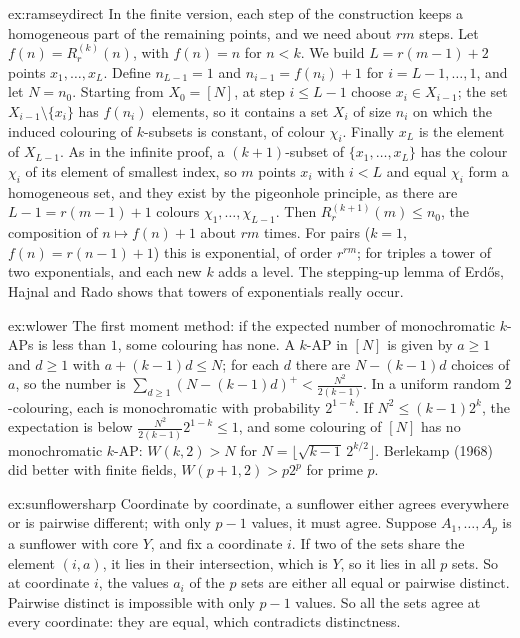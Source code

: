 \begin{solution}{ex:ramseydirect}
\idea In the finite version, each step of the construction keeps a homogeneous part of the remaining points, and we need about $rm$ steps.
\writeup Let $f(n)=R^{(k)}_r(n)$, with $f(n)=n$ for $n<k$. We build $L=r(m-1)+2$ points $x_1,\dots,x_L$. Define $n_{L-1}=1$ and
$n_{i-1}=f(n_i)+1$ for $i=L-1,\dots,1$, and let $N=n_0$. Starting from $X_0=[N]$, at step $i\le L-1$ choose $x_i\in X_{i-1}$; the set $X_{i-1}\setminus\{x_i\}$ has $f(n_i)$ elements, so it contains a set $X_i$ of
size $n_i$ on which the induced colouring of $k$-subsets is constant, of colour $\chi_i$. Finally $x_L$ is the element of $X_{L-1}$. As in the infinite proof, a $(k+1)$-subset of $\{x_1,\dots,x_L\}$ has the colour
$\chi_i$ of its element of smallest index, so $m$ points $x_i$ with $i<L$ and equal $\chi_i$ form a homogeneous set, and they exist by the pigeonhole principle, as there are $L-1=r(m-1)+1$ colours $\chi_1,\dots,\chi_{L-1}$. Then $R^{(k+1)}_r(m)\le n_0$, the composition of $n\mapsto f(n)+1$ about $rm$ times. For pairs ($k=1$, $f(n)=r(n-1)+1$) this is exponential, of order $r^{rm}$; for triples a
tower of two exponentials, and each new $k$ adds a level. The stepping-up lemma of Erd\H os, Hajnal and Rado shows that towers of exponentials really occur.
\end{solution}

\begin{solution}{ex:wlower}
\idea The first moment method: if the expected number of monochromatic $k$-APs is less than $1$, some colouring has none.
\writeup A $k$-AP in $[N]$ is given by $a\ge1$ and $d\ge1$ with $a+(k-1)d\le N$; for each $d$ there are $N-(k-1)d$ choices of $a$, so the number is $\sum_{d\ge1}(N-(k-1)d)^+<\frac{N^2}{2(k-1)}$. In a uniform random
$2$-colouring, each is monochromatic with probability $2^{1-k}$. If $N^2\le(k-1)2^k$, the expectation is below $\frac{N^2}{2(k-1)}2^{1-k}\le1$, and some colouring of $[N]$ has no monochromatic $k$-AP:
$W(k,2)>N$ for $N=\lfloor\sqrt{k-1}\,2^{k/2}\rfloor$. Berlekamp (1968) did better with finite fields, $W(p+1,2)>p2^p$ for prime $p$.
\end{solution}

\begin{solution}{ex:sunflowersharp}
\idea Coordinate by coordinate, a sunflower either agrees everywhere or is pairwise different; with only $p-1$ values, it must agree.
\writeup Suppose $A_1,\dots,A_p$ is a sunflower with core $Y$, and fix a coordinate $i$. If two of the sets share the element $(i,a)$, it lies in their intersection, which is $Y$, so it lies in all $p$ sets. So at
coordinate $i$, the values $a_i$ of the $p$ sets are either all equal or pairwise distinct. Pairwise distinct is impossible with only $p-1$ values. So all the sets agree at every coordinate: they are equal,
which contradicts distinctness.
\end{solution}

